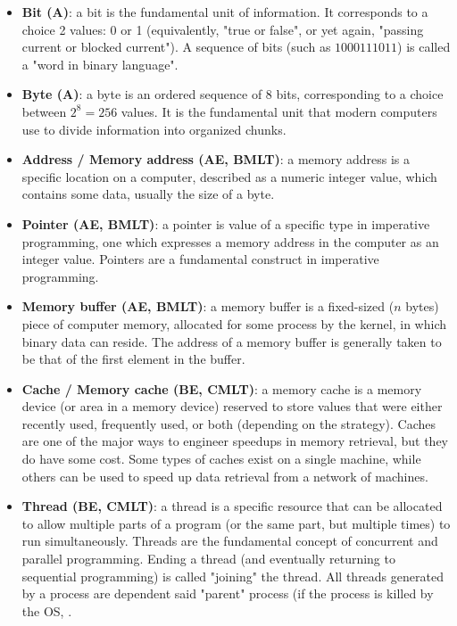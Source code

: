\documentclass{article}
\begin{document}
\begin{itemize}
	\item \textbf{Bit (A)}: a bit is the fundamental unit of information. It corresponds to a choice 2 values: 0 or 1 (equivalently, "true or false", or yet again, "passing current or blocked current"). A sequence of bits (such as $1000111011$) is called a "word in binary language".

	\item \textbf{Byte (A)}: a byte is an ordered sequence of 8 bits, corresponding to a choice between $2^8 = 256$ values. It is the fundamental unit that modern computers use to divide information into organized chunks. 

	\item \textbf{Address / Memory address (AE, BMLT)}: a memory address is a specific location on a computer, described as a numeric integer value, which contains some data, usually the size of a byte.

	\item \textbf{Pointer (AE, BMLT)}: a pointer is value of a specific type in imperative programming, one which expresses a memory address in the computer as an integer value. Pointers are a fundamental construct in imperative programming.

	\item \textbf{Memory buffer (AE, BMLT)}: a memory buffer is a fixed-sized ($n$ bytes) piece of computer memory, allocated for some process by the kernel, in which binary data can reside. The address of a memory buffer is generally taken to be that of the first element in the buffer.

	\item \textbf{Cache / Memory cache (BE, CMLT)}: a memory cache is a memory device (or area in a memory device) reserved to store values that were either recently used, frequently used, or both (depending on the strategy). Caches are one of the major ways to engineer speedups in memory retrieval, but they do have some cost. Some types of caches exist on a single machine, while others can be used to speed up data retrieval from a network of machines.

	\item \textbf{Thread (BE, CMLT)}: a thread is a specific resource that can be allocated to allow multiple parts of a program (or the same part, but multiple times) to run simultaneously. Threads are the fundamental concept of concurrent and parallel programming. Ending a thread (and eventually returning to sequential programming) is called "joining" the thread. All threads generated by a process are dependent said "parent" process (if the process is killed by the OS, .


\end{itemize}
\end{document}
